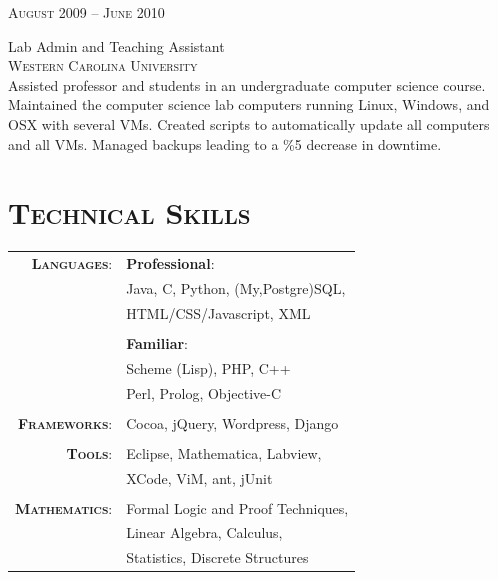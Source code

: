 \documentclass[10pt]{article}
\begin{document}
\begin{minipage}[t]{0.5\textwidth}
   \raggedleft
   \textsc{\normalsize August 2009 -- June 2010}\par
   \raggedright\large Lab Admin and Teaching Assistant\\ 
   \textsc{Western Carolina University}\\
   \normalsize{Assisted professor and students in an undergraduate 
   computer science course. Maintained the computer science lab 
   computers running Linux, Windows, and OSX with several VMs.
   Created scripts to automatically update all computers and all VMs.
   Managed backups leading to a \%5 decrease in downtime.}\\[5pt]

\section{\textsc{Technical Skills}}
   \begin{tabular}{rl}
      \textbf{\textsc{Languages}}:
                        & \textbf{Professional}:\\
                        & Java, C, Python, (My,Postgre)SQL,\\
                        & HTML/CSS/Javascript, XML\\
                        & \\
                        & \textbf{Familiar}:\\
                        & Scheme (Lisp), PHP, C++\\
                        & Perl, Prolog, Objective-C\\
                        & \\
      \textbf{\textsc{Frameworks}}:
                        & Cocoa, jQuery, Wordpress, Django\\
                        & \\
      \textbf{\textsc{Tools}}:
                        & Eclipse, Mathematica, Labview,\\
                        & XCode, ViM, ant, jUnit\\
                        & \\
      \textbf{\textsc{Mathematics}}:
                        & Formal Logic and Proof Techniques,\\
                        & Linear Algebra, Calculus,\\
                        & Statistics, Discrete Structures\\
\end{tabular}
\end{minipage}
\end{document}
